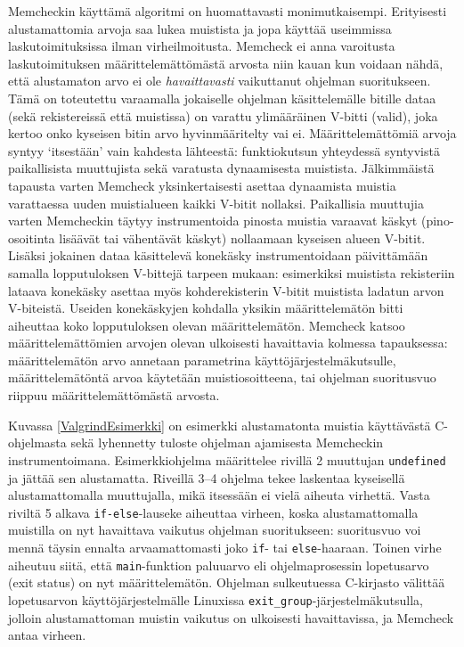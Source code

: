 Memcheckin käyttämä algoritmi on huomattavasti monimutkaisempi.
Erityisesti alustamattomia arvoja saa lukea muistista ja jopa käyttää useimmissa laskutoimituksissa ilman virheilmoitusta.
Memcheck ei anna varoitusta laskutoimituksen määrittelemättömästä arvosta niin kauan kun voidaan nähdä,
että alustamaton arvo ei ole \emph{havaittavasti} vaikuttanut ohjelman suoritukseen.
Tämä on toteutettu varaamalla jokaiselle ohjelman käsittelemälle bitille dataa (sekä rekistereissä että muistissa)
on varattu ylimääräinen V-bitti (valid),
joka kertoo onko kyseisen bitin arvo hyvinmääritelty vai ei.
Määrittelemättömiä arvoja syntyy `itsestään' vain kahdesta lähteestä:
funktiokutsun yhteydessä syntyvistä paikallisista muuttujista sekä varatusta dynaamisesta muistista.
Jälkimmäistä tapausta varten Memcheck yksinkertaisesti asettaa dynaamista muistia varattaessa uuden muistialueen kaikki V-bitit nollaksi.
Paikallisia muuttujia varten Memcheckin täytyy instrumentoida pinosta muistia varaavat käskyt (pino-osoitinta lisäävät tai vähentävät käskyt)
nollaamaan kyseisen alueen V-bitit.
Lisäksi jokainen dataa käsittelevä konekäsky instrumentoidaan päivittämään samalla lopputuloksen V-bittejä tarpeen mukaan:
esimerkiksi muistista rekisteriin lataava konekäsky asettaa myös kohderekisterin V-bitit muistista ladatun arvon V-biteistä.
Useiden konekäskyjen kohdalla yksikin määrittelemätön bitti aiheuttaa koko lopputuloksen olevan määrittelemätön.
Memcheck katsoo määrittelemättömien arvojen olevan ulkoisesti havaittavia kolmessa tapauksessa:
määrittelemätön arvo annetaan parametrina käyttöjärjestelmäkutsulle,
määrittelemätöntä arvoa käytetään muistiosoitteena,
tai ohjelman suoritusvuo riippuu määrittelemättömästä arvosta.

Kuvassa \ref{ValgrindEsimerkki} on esimerkki alustamatonta muistia käyttävästä C-ohjelmasta
sekä lyhennetty tuloste ohjelman ajamisesta Memcheckin instrumentoimana.
Esimerkkiohjelma määrittelee rivillä 2 muuttujan \texttt{undefined} ja jättää sen alustamatta.
Riveillä 3--4 ohjelma tekee laskentaa kyseisellä alustamattomalla muuttujalla,
mikä itsessään ei vielä aiheuta virhettä.
Vasta riviltä 5 alkava \texttt{if-else}-lauseke aiheuttaa virheen,
koska alustamattomalla muistilla on nyt havaittava vaikutus ohjelman suoritukseen:
suoritusvuo voi mennä täysin ennalta arvaamattomasti joko \texttt{if}- tai \texttt{else}-haaraan.
Toinen virhe aiheutuu siitä,
että \texttt{main}-funktion paluuarvo eli ohjelmaprosessin lopetusarvo (exit status)
on nyt määrittelemätön.
Ohjelman sulkeutuessa C-kirjasto välittää lopetusarvon käyttöjärjestelmälle
Linuxissa \texttt{exit\_group}-järjestelmäkutsulla,
jolloin alustamattoman muistin vaikutus on ulkoisesti havaittavissa,
ja Memcheck antaa virheen. 

